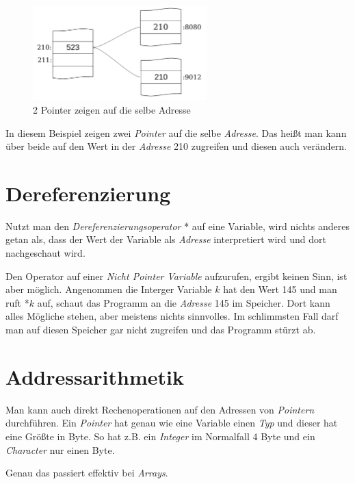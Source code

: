 \documentclass[c_worksheet.tex]{subfiles}
\begin{document}
\begin{figure}[h]
\centering
\includegraphics[width=0.6\textwidth]{Grafiken/Pointer/2pointer}
\caption{2 Pointer zeigen auf die selbe Adresse} 
\end{figure}

In diesem Beispiel zeigen zwei \emph{Pointer} auf die selbe \emph{Adresse}. Das heißt man kann über beide auf den Wert in der \emph{Adresse} 210 zugreifen und diesen auch verändern.

 



\section{Dereferenzierung}

Nutzt man den \emph{Dereferenzierungsoperator} * auf eine Variable, wird nichts anderes getan als, dass der Wert der Variable als \emph{Adresse} interpretiert wird und dort nachgeschaut wird. 

Den Operator auf einer \emph{Nicht Pointer Variable} aufzurufen, ergibt keinen Sinn, ist aber möglich. Angenommen die Interger Variable \(k\) hat den Wert 145 und man ruft *\(k\) auf, schaut das Programm an die \emph{Adresse} 145 im Speicher. Dort kann alles Mögliche stehen, aber meistens nichts sinnvolles. Im schlimmsten Fall darf man auf diesen Speicher gar nicht zugreifen und das Programm stürzt ab.



\section{Addressarithmetik}

Man kann auch direkt Rechenoperationen auf den Adressen von \emph{Pointern} durchführen. Ein \emph{Pointer} hat genau wie eine Variable einen \emph{Typ} und dieser hat eine Größte in Byte. So hat z.B. ein \emph{Integer} im Normalfall 4 Byte und ein \emph{Character} nur einen Byte.

 

Genau das passiert effektiv bei \emph{Arrays}.
\end{document}
